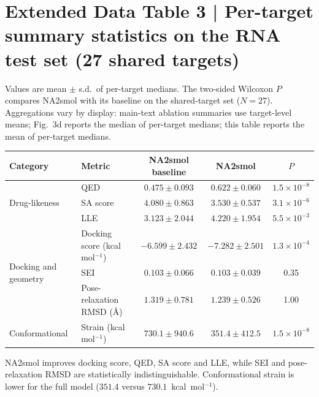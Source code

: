 \section*{Extended Data Table 3 | Per-target summary statistics on the RNA test set (27 shared targets)}
Values are mean $\pm$ s.d.\ of per-target medians. The two-sided Wilcoxon $P$ compares NA2smol with its baseline on the shared-target set ($N=27$). Aggregations vary by display: main-text ablation summaries use target-level means; Fig.~3d reports the median of per-target medians; this table reports the mean of per-target medians.
\begin{center}\footnotesize
\setlength{\tabcolsep}{3.5pt}
\begin{tabular}{@{}llccc@{}}
\toprule
\textbf{Category} & \textbf{Metric} & \textbf{NA2smol baseline} & \textbf{NA2smol} & \textbf{$P$} \\
\midrule
\multirow{3}{*}{Drug-likeness}
  & QED                              & $0.475 \pm 0.093$ & $0.622 \pm 0.060$ & $1.5\times10^{-8}$ \\
  & SA score                         & $4.080 \pm 0.863$ & $3.530 \pm 0.537$ & $3.1\times10^{-6}$ \\
  & LLE                              & $3.123 \pm 2.044$ & $4.220 \pm 1.954$ & $5.5\times10^{-3}$ \\
\midrule
\multirow{3}{*}{Docking and geometry}
  & Docking score (kcal mol$^{-1}$)  & $-6.599 \pm 2.432$ & $-7.282 \pm 2.501$ & $1.3\times10^{-4}$ \\
  & SEI                              & $0.103 \pm 0.066$ & $0.103 \pm 0.039$ & 0.35 \\
  & Pose-relaxation RMSD (\AA)       & $1.319 \pm 0.781$ & $1.239 \pm 0.526$ & 1.00 \\
\midrule
Conformational
  & Strain (kcal mol$^{-1}$)         & $730.1 \pm 940.6$ & $351.4 \pm 412.5$ & $1.5\times10^{-8}$ \\
\bottomrule
\end{tabular}\end{center}

NA2smol improves docking score, QED, SA score and LLE, while SEI and pose-relaxation RMSD are statistically indistinguishable. Conformational strain is lower for the full model ($351.4$ versus $730.1$~kcal~mol$^{-1}$).
